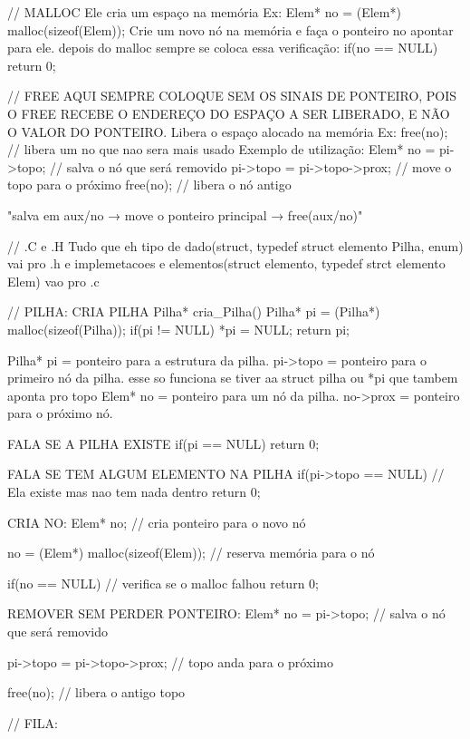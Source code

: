 // MALLOC
Ele cria um espaço na memória  
Ex:
    Elem* no = (Elem*) malloc(sizeof(Elem));
    Crie um novo nó na memória e faça o ponteiro no apontar para ele.
depois do malloc sempre se coloca essa verificação:
    if(no == NULL)
        return 0;



// FREE
AQUI SEMPRE COLOQUE SEM OS SINAIS DE PONTEIRO, POIS O FREE RECEBE O ENDEREÇO DO ESPAÇO A SER LIBERADO, E NÃO O VALOR DO PONTEIRO.
Libera o espaço alocado na memória
Ex: 
    free(no); // libera um no que nao sera mais usado
Exemplo de utilização:
    Elem* no = pi->topo; // salva o nó que será removido
    pi->topo = pi->topo->prox; // move o topo para o próximo
    free(no); // libera o nó antigo

    "salva em aux/no → move o ponteiro principal → free(aux/no)"



// .C e .H
Tudo que eh tipo de dado(struct, typedef struct elemento Pilha, enum) vai pro .h e implemetacoes e elementos(struct elemento, typedef strct elemento Elem) vao pro .c



// PILHA:
CRIA PILHA
Pilha* cria_Pilha(){
    Pilha* pi = (Pilha*) malloc(sizeof(Pilha));
    if(pi != NULL)
        *pi = NULL;
    return pi;
}

Pilha* pi = ponteiro para a estrutura da pilha.
pi->topo = ponteiro para o primeiro nó da pilha. esse so funciona se tiver aa struct pilha
ou 
*pi que tambem aponta pro topo
Elem* no = ponteiro para um nó da pilha.
no->prox = ponteiro para o próximo nó.

FALA SE A PILHA EXISTE
if(pi == NULL)
    return 0;

FALA SE TEM ALGUM ELEMENTO NA PILHA
if(pi->topo == NULL) // Ela existe mas nao tem nada dentro
    return 0;


CRIA NO:
Elem* no; // cria ponteiro para o novo nó

no = (Elem*) malloc(sizeof(Elem)); // reserva memória para o nó

if(no == NULL) // verifica se o malloc falhou
    return 0;


REMOVER SEM PERDER PONTEIRO:
Elem* no = pi->topo; // salva o nó que será removido

pi->topo = pi->topo->prox; // topo anda para o próximo

free(no); // libera o antigo topo



// FILA:

